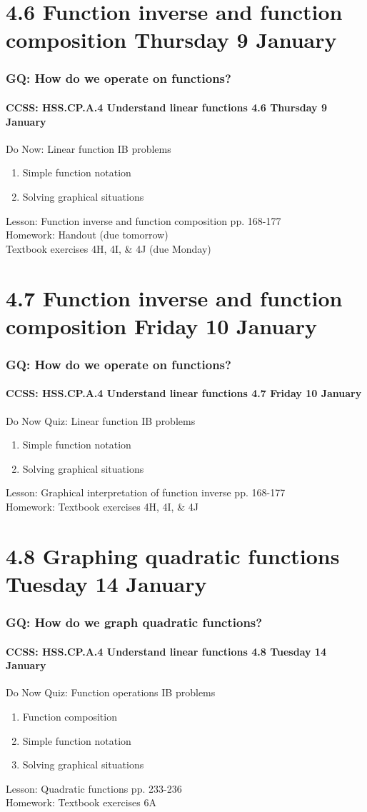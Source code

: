 \documentclass{beamer}
\begin{document}
\section{4.6 Function inverse and function composition Thursday 9 January}
\frame
{
  \frametitle{GQ: How do we operate on functions?}
  \framesubtitle{CCSS: HSS.CP.A.4 Understand linear functions \hfill \alert{4.6 Thursday 9 January}}

  \begin{block}{Do Now: Linear function IB problems}
  \begin{enumerate}
      \item Simple function notation
      \item Solving graphical situations
  \end{enumerate}
  \end{block}
  Lesson: Function inverse and function composition pp. 168-177 \\ \smallskip
  Homework: Handout (due tomorrow)\\
  Textbook exercises 4H, 4I, \& 4J (due Monday)
}

\section{4.7 Function inverse and function composition Friday 10 January}
\frame
{
  \frametitle{GQ: How do we operate on functions?}
  \framesubtitle{CCSS: HSS.CP.A.4 Understand linear functions \hfill \alert{4.7 Friday 10 January}}

  \begin{block}{Do Now Quiz: Linear function IB problems}
  \begin{enumerate}
      \item Simple function notation
      \item Solving graphical situations
  \end{enumerate}
  \end{block}
  Lesson: Graphical interpretation of function inverse pp. 168-177 \\ \smallskip
  Homework: Textbook exercises 4H, 4I, \& 4J
}

\section{4.8 Graphing quadratic functions Tuesday 14 January}
\frame
{
  \frametitle{GQ: How do we graph quadratic functions?}
  \framesubtitle{CCSS: HSS.CP.A.4 Understand linear functions \hfill \alert{4.8 Tuesday 14 January}}

  \begin{block}{Do Now Quiz: Function operations IB problems}
  \begin{enumerate}
      \item Function composition
      \item Simple function notation
      \item Solving graphical situations
  \end{enumerate}
  \end{block}
  Lesson: Quadratic functions pp. 233-236 \\ \smallskip
  Homework: Textbook exercises 6A
}
\end{document}
